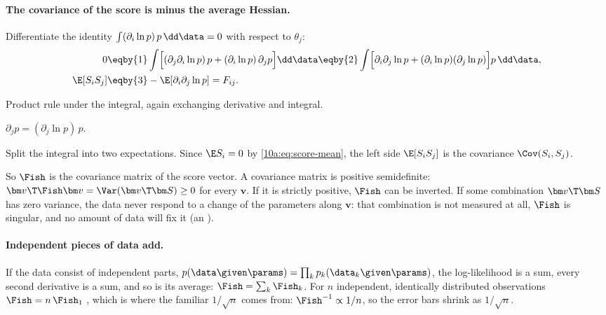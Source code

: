 \paragraph{The covariance of the score is minus the average Hessian.} Differentiate the identity
$\int(\partial_i\ln p)\,p\,\dd\data=0$ with respect to $\theta_j$:
\begin{align}
  0&\eqby{1}\int\Bigl[(\partial_j\partial_i\ln p)\,p+(\partial_i\ln p)\,\partial_jp\Bigr]\dd\data
   \eqby{2}\int\Bigl[\partial_i\partial_j\ln p+(\partial_i\ln p)(\partial_j\ln p)\Bigr]p\,\dd\data ,
  \nonumber\\
  \E[S_iS_j]&\eqby{3}-\E[\partial_i\partial_j\ln p]=F_{ij} .
  \label{10a:eq:two-faces}
\end{align}
\begin{explain}
  \item Product rule under the integral, again exchanging derivative and integral.
  \item $\partial_jp=(\partial_j\ln p)\,p$.
  \item Split the integral into two expectations. Since $\E S_i=0$ by \eqref{10a:eq:score-mean}, the left
        side $\E[S_iS_j]$ is the covariance $\Cov(S_i,S_j)$.
\end{explain}
So $\Fish$ is the covariance matrix of the score vector. A covariance matrix is positive semidefinite:
$\bm v\T\Fish\bm v=\Var(\bm v\T\bm S)\ge0$ for every $\bm v$. If it is strictly positive, $\Fish$ can be
inverted. If some combination $\bm v\T\bm S$ has zero variance, the data never respond to a change of the
parameters along $\bm v$: that combination is not measured at all, $\Fish$ is singular, and no amount of
data will fix it (an ).

\paragraph{Independent pieces of data add.} If the data consist of independent parts,
$p(\data\given\params)=\prod_kp_k(\data_k\given\params)$, the log-likelihood is a sum, every second derivative is
a sum, and so is its average: $\Fish=\sum_k\Fish_k$. For $n$ independent, identically distributed
observations $\Fish=n\,\Fish_1$ , which is where the familiar $1/\sqrt n$ comes from:
$\Fish^{-1}\propto1/n$, so the error bars shrink as $1/\sqrt n$.

